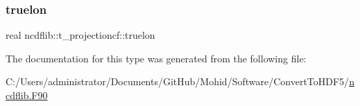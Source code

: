 \mbox{\label{structncdflib_1_1t__projectioncf_a3a4c2ed39b41532000c84d2ecf1d7bf4}} 
\subsubsection{\texorpdfstring{truelon}{truelon}}
{\footnotesize\ttfamily real ncdflib\+::t\+\_\+projectioncf\+::truelon\hspace{0.3cm}{\ttfamily [private]}}



The documentation for this type was generated from the following file\+:\begin{DoxyCompactItemize}
\item 
C\+:/\+Users/administrator/\+Documents/\+Git\+Hub/\+Mohid/\+Software/\+Convert\+To\+H\+D\+F5/\mbox{\hyperlink{ncdflib_8_f90}{ncdflib.\+F90}}\end{DoxyCompactItemize}
